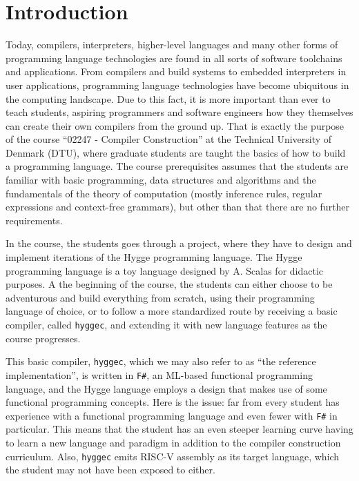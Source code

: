 \chapter{Introduction}

Today, compilers, interpreters, higher-level languages and many other forms of programming language technologies are found
in all sorts of software toolchains and applications. From compilers and build systems to embedded interpreters in user
applications, programming language technologies have become ubiquitous in the computing landscape. Due to this fact, it is
more important than ever to teach students, aspiring programmers and software engineers how they themselves
can create their own compilers from the ground up. That is exactly the purpose of the course ``02247 - Compiler Construction''
at the Technical University of Denmark (DTU), where graduate students are taught the basics of how to build a programming language.
The course prerequisites assumes that the students are familiar with basic programming, data structures and algorithms and
the fundamentals of the theory of computation (mostly inference rules, regular expressions and context-free grammars), but
other than that there are no further requirements.

In the course, the students goes through a project, where they have to design and implement iterations of the Hygge programming language.
The Hygge programming language is a toy language designed by A. Scalas for didactic purposes. A the beginning of the course,
the students can either choose to be adventurous and build everything from scratch, using their programming language of choice,
or to follow a more standardized route by receiving a basic compiler, called \texttt{hyggec}, and extending it with new
language features as the course progresses.

This basic compiler, \texttt{hyggec}, which we may also refer to as ``the reference implementation'', is written in \texttt{F\#},
an ML-based functional programming language, and the Hygge language employs a design that makes use of some functional programming concepts.
Here is the issue: far from every student has experience with a functional programming language and even fewer with \texttt{F\#}
in particular. This means that the student has an even steeper learning curve having to learn a new language and paradigm
in addition to the compiler construction curriculum. Also, \texttt{hyggec} emits RISC-V assembly as its target language,
which the student may not have been exposed to either.

